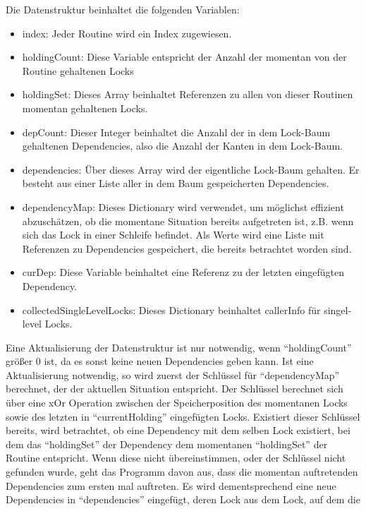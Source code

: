 Die Datenstruktur beinhaltet die folgenden Variablen:
\begin{itemize}
    \item index: Jeder Routine wird ein Index zugewiesen.
    \item holdingCount: Diese Variable entspricht der Anzahl der momentan von der 
        Routine gehaltenen Locks
    \item holdingSet: Dieses Array beinhaltet Referenzen zu allen von dieser 
        Routinen momentan gehaltenen Locks.
    \item depCount: Dieser Integer beinhaltet die Anzahl der in dem Lock-Baum 
        gehaltenen Dependencies, also die Anzahl der Kanten in dem Lock-Baum.
    \item dependencies: Über dieses Array wird der eigentliche Lock-Baum 
        gehalten. Er besteht aus einer Liste aller in dem Baum gespeicherten 
        Dependencies.
    \item dependencyMap: Dieses Dictionary wird verwendet, um möglichst 
        effizient abzuschätzen, ob die momentane Situation bereits aufgetreten 
        ist, z.B. wenn sich das Lock in einer Schleife befindet. Als Werte wird
        eine Liste mit Referenzen zu Dependencies gespeichert, die bereits 
        betrachtet worden sind.
    \item curDep: Diese Variable beinhaltet eine Referenz zu der letzten 
        eingefügten Dependency.
    \item collectedSingleLevelLocks: Dieses Dictionary beinhaltet callerInfo für 
        singel-level Locks.
\end{itemize}
Eine Aktualisierung der Datenstruktur ist nur notwendig, wenn ``holdingCount'' 
größer 0 ist, da es sonst keine neuen Dependencies geben kann. Ist eine 
Aktualisierung notwendig, so wird zuerst der Schlüssel für ``dependencyMap''
berechnet, der der aktuellen Situation entspricht. Der Schlüssel berechnet sich 
über eine xOr Operation zwischen der Speicherposition des momentanen Locks 
sowie des letzten in ``currentHolding'' eingefügten Locks. Existiert dieser 
Schlüssel bereits, wird betrachtet, ob eine Dependency mit dem selben Lock
existiert, bei dem das ``holdingSet'' der Dependency dem momentanen ``holdingSet''
der Routine entspricht. Wenn diese nicht übereinstimmen, oder der Schlüssel
nicht gefunden wurde, geht das Programm davon aus, dass die momentan auftretenden
Dependencies zum ersten mal auftreten. Es wird dementsprechend eine neue
Dependencies in ``dependencies'' eingefügt, deren Lock aus dem Lock, auf dem die
